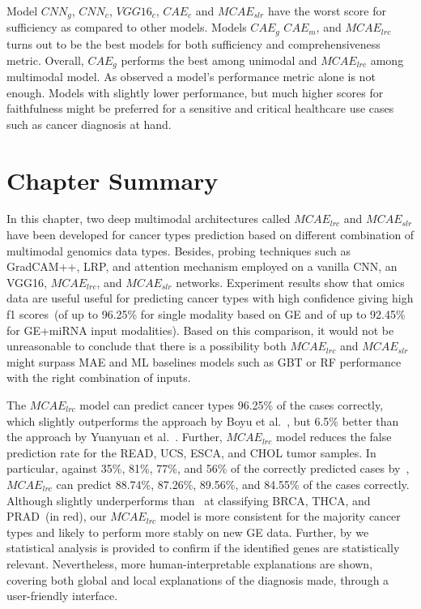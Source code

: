 \hspace*{3.5mm} Model $CNN_{g}$, $CNN_{c}$, $VGG16_{c}$, $CAE_{c}$ and $MCAE_{slr}$ have the worst score for sufficiency as compared to other models. Models $CAE_{g}$  $CAE_{m}$, and $MCAE_{lrc}$ turns out to be the best models for both sufficiency and comprehensiveness metric. Overall, $CAE_{g}$ performs the best among unimodal and $MCAE_{lrc}$ among multimodal model. As observed a model’s performance metric alone is not enough. Models with slightly lower performance, but much higher scores for faithfulness might be preferred for a sensitive and critical healthcare use cases such as cancer diagnosis at hand. 

\section{Chapter Summary}\label{chapter_5:conclusion}
In this chapter, two deep multimodal architectures called $MCAE_{lrc}$ and $MCAE_{slr}$ have been developed for cancer types prediction based on different combination of multimodal genomics data types. Besides, probing techniques such as GradCAM++, LRP, and attention mechanism employed on a vanilla CNN, an VGG16, $MCAE_{lrc}$, and $MCAE_{slr}$ networks. Experiment results show that omics data are useful useful for predicting cancer types with high confidence giving high f1 scores~(of up to 96.25\% for single modality based on GE and of up to 92.45\% for GE+miRNA input modalities). Based on this comparison, it would not be unreasonable to conclude that there is a possibility both $MCAE_{lrc}$ and $MCAE_{slr}$ might surpass MAE and ML baselines models such as GBT or RF performance with the right combination of inputs. 

\hspace*{3.5mm} The $MCAE_{lrc}$ model can predict cancer types 96.25\% of the cases correctly, which slightly outperforms the approach by Boyu et al.~\cite{lyu2018deep}, but 6.5\% better than the approach by Yuanyuan et al.~\cite{li2017comprehensive}. Further, $MCAE_{lrc}$ model reduces the false prediction rate for the READ, UCS, ESCA, and CHOL tumor samples. In particular, against 35\%, 81\%, 77\%, and 56\% of the correctly predicted cases by~\cite{lyu2018deep}, $MCAE_{lrc}$ can predict 88.74\%, 87.26\%, 89.56\%, and 84.55\% of the cases correctly. Although slightly underperforms than~\cite{lyu2018deep} at classifying BRCA, THCA, and PRAD~(in red), our $MCAE_{lrc}$ model is more consistent for the majority cancer types and likely to perform more stably on new GE data. Further, by we statistical analysis is provided to confirm if the identified genes are statistically relevant. Nevertheless, more human-interpretable explanations are shown, covering both global and local explanations of the diagnosis made, through a user-friendly interface. 

